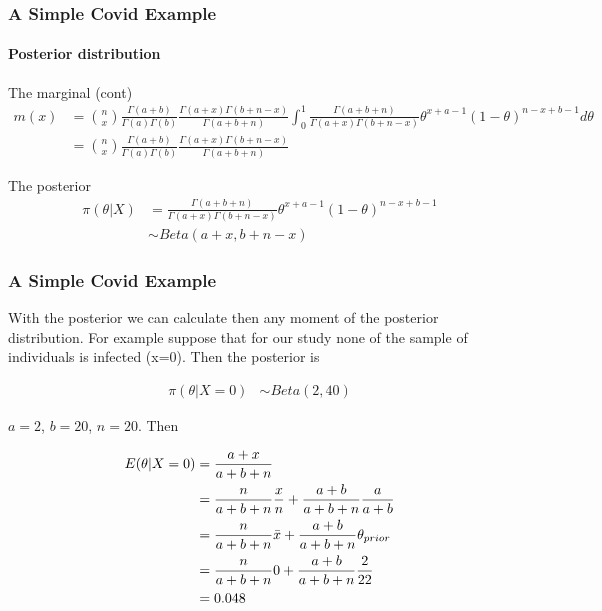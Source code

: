 \documentclass[
  shownotes,
  xcolor={svgnames},
  hyperref={colorlinks,citecolor=DarkBlue,linkcolor=DarkRed,urlcolor=DarkBlue}
  ]{beamer}
\begin{document}
\begin{frame}[fragile]
\frametitle{A Simple Covid Example}
\framesubtitle{Posterior distribution}
The marginal (cont)
\begin{align}
 m(x) &= \binom{n}{x} \frac{\Gamma(a+b)}{\Gamma(a)\Gamma(b)}  \frac{\Gamma(a+x)\Gamma(b+n-x)}{\Gamma(a+b+n)} \int_0^1  \frac{\Gamma(a+b+n)}{\Gamma(a+x)\Gamma(b+n-x)} \theta^{x+a-1}(1-\theta)^{n-x+b-1}  d\theta \\
 &= \binom{n}{x} \frac{\Gamma(a+b)}{\Gamma(a)\Gamma(b)}  \frac{\Gamma(a+x)\Gamma(b+n-x)}{\Gamma(a+b+n)}
\end{align}

The posterior
\begin{align}
\pi(\theta|X) &=  \frac{\Gamma(a+b+n)}{\Gamma(a+x)\Gamma(b+n-x)} \theta^{x+a-1}(1-\theta)^{n-x+b-1}  \\
              &\sim Beta(a+x,b+n-x)
\end{align}

\end{frame}
\begin{frame}[fragile]
\frametitle{A Simple Covid Example}
With the posterior we can calculate then any moment of the posterior distribution. For example suppose that for our study none of the sample of individuals is infected (x=0). Then the posterior is 

\begin{align}
\pi(\theta|X=0) &\sim Beta(2,40)
\end{align}

$a= 2$, $b=20$, $n=20$. Then

\begin{align}
\tiny
E(\theta|X=0)  &= \frac{a+x}{a+b+n} \\
               &= \frac{n}{a+b+n} \frac{x}{n} + \frac{a+b}{a+b+n} \frac{a}{a+b}  \\
               &= \frac{n}{a+b+n} \bar x + \frac{a+b}{a+b+n} \theta_{prior}  \\
               &= \frac{n}{a+b+n} 0 + \frac{a+b}{a+b+n} \frac{2}{22}  \\
 &= 0.048 
\end{align}

\end{frame}
\end{document}
